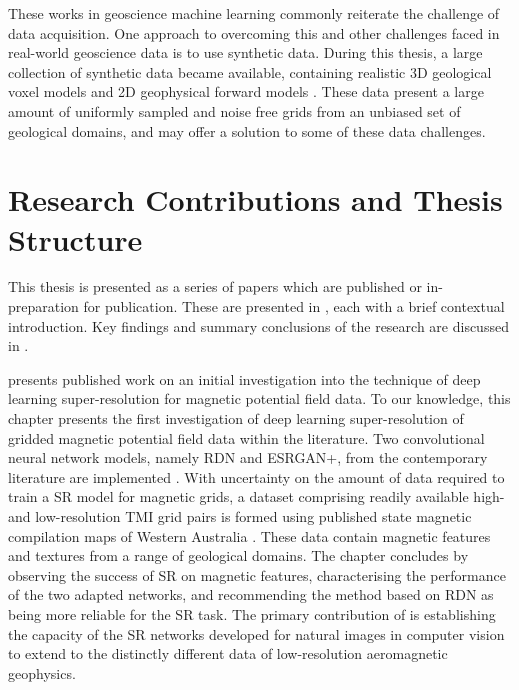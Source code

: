 These works in geoscience machine learning commonly reiterate the challenge of data acquisition.
One approach to overcoming this and other challenges faced in real-world geoscience data is to use synthetic data.
During this thesis, a large collection of synthetic data became available, containing realistic 3D geological voxel models and 2D geophysical forward models \parencite{jessellNoddyverseMassiveData2022}.
These data present a large amount of uniformly sampled and noise free grids from an unbiased set of geological domains, and may offer a solution to some of these data challenges.

\section{Research Contributions and Thesis Structure}
This thesis is presented as a series of papers which are published or in-preparation for publication.
These are presented in , each with a brief contextual introduction.
Key findings and summary conclusions of the research are discussed in .

 presents published work on an initial investigation into the technique of deep learning super-resolution for magnetic potential field data.
To our knowledge, this chapter presents the first investigation of deep learning super-resolution of gridded magnetic potential field data within the literature.
Two convolutional neural network models, namely RDN and ESRGAN+, from the contemporary literature are implemented \parencite{zhangResidualDenseNetwork2018,limEnhancedDeepResidual2017}.
With uncertainty on the amount of data required to train a SR model for magnetic grids, a dataset comprising readily available high- and low-resolution TMI grid pairs is formed using published state magnetic compilation maps of Western Australia \parencite{brett20MagneticMerged2020}.
These data contain magnetic features and textures from a range of geological domains.
The chapter concludes by observing the success of SR on magnetic features, characterising the performance of the two adapted networks, and recommending the method based on RDN as being more reliable for the SR task.
The primary contribution of  is establishing the capacity of the SR networks developed for natural images in computer vision to extend to the distinctly different data of low-resolution aeromagnetic geophysics.

